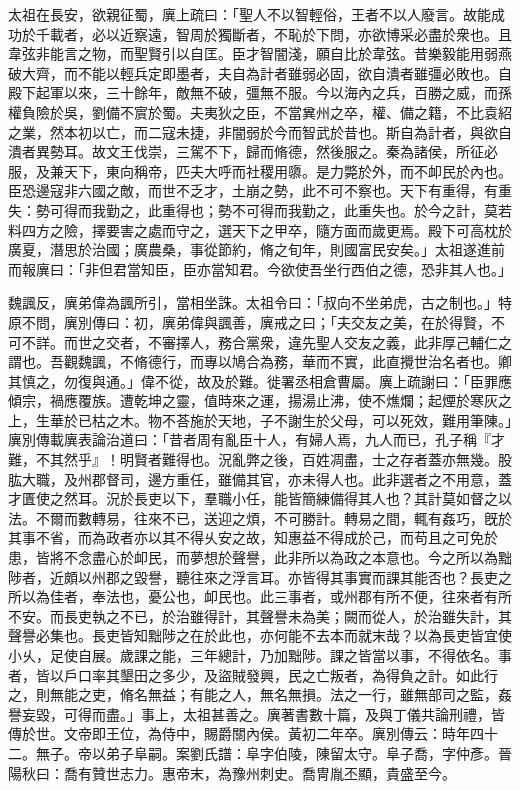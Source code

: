 \begin{pinyinscope}
太祖在長安，欲親征蜀，廙上疏曰：「聖人不以智輕俗，王者不以人廢言。故能成功於千載者，必以近察遠，智周於獨斷者，不恥於下問，亦欲博采必盡於衆也。且韋弦非能言之物，而聖賢引以自匡。臣才智闇淺，願自比於韋弦。昔樂毅能用弱燕破大齊，而不能以輕兵定即墨者，夫自為計者雖弱必固，欲自潰者雖彊必敗也。自殿下起軍以來，三十餘年，敵無不破，彊無不服。今以海內之兵，百勝之威，而孫權負險於吳，劉備不賔於蜀。夫夷狄之臣，不當兾州之卒，權、備之籍，不比袁紹之業，然本初以亡，而二寇未捷，非闇弱於今而智武於昔也。斯自為計者，與欲自潰者異勢耳。故文王伐崇，三駕不下，歸而脩德，然後服之。秦為諸侯，所征必服，及兼天下，東向稱帝，匹夫大呼而社稷用隳。是力斃於外，而不卹民於內也。臣恐邊寇非六國之敵，而世不乏才，土崩之勢，此不可不察也。天下有重得，有重失：勢可得而我勤之，此重得也；勢不可得而我勤之，此重失也。於今之計，莫若料四方之險，擇要害之處而守之，選天下之甲卒，隨方面而歲更焉。殿下可高枕於廣夏，潛思於治國；廣農桑，事從節約，脩之旬年，則國富民安矣。」太祖遂進前而報廙曰：「非但君當知臣，臣亦當知君。今欲使吾坐行西伯之德，恐非其人也。」

魏諷反，廙弟偉為諷所引，當相坐誅。太祖令曰：「叔向不坐弟虎，古之制也。」特原不問，廙別傳曰：初，廙弟偉與諷善，廙戒之曰；「夫交友之美，在於得賢，不可不詳。而世之交者，不審擇人，務合黨衆，違先聖人交友之義，此非厚己輔仁之謂也。吾觀魏諷，不脩德行，而專以鳩合為務，華而不實，此直攪世治名者也。卿其慎之，勿復與通。」偉不從，故及於難。徙署丞相倉曹屬。廙上疏謝曰：「臣罪應傾宗，禍應覆族。遭乾坤之靈，值時來之運，揚湯止沸，使不燋爛；起煙於寒灰之上，生華於已枯之木。物不荅施於天地，子不謝生於父母，可以死效，難用筆陳。」廙別傳載廙表論治道曰：「昔者周有亂臣十人，有婦人焉，九人而已，孔子稱『才難，不其然乎』！明賢者難得也。況亂弊之後，百姓凋盡，士之存者蓋亦無幾。股肱大職，及州郡督司，邊方重任，雖備其官，亦未得人也。此非選者之不用意，蓋才匱使之然耳。況於長吏以下，羣職小任，能皆簡練備得其人也？其計莫如督之以法。不爾而數轉易，往來不已，送迎之煩，不可勝計。轉易之間，輒有姦巧，旣於其事不省，而為政者亦以其不得乆安之故，知惠益不得成於己，而苟且之可免於患，皆將不念盡心於卹民，而夢想於聲譽，此非所以為政之本意也。今之所以為黜陟者，近頗以州郡之毀譽，聽往來之浮言耳。亦皆得其事實而課其能否也？長吏之所以為佳者，奉法也，憂公也，卹民也。此三事者，或州郡有所不便，往來者有所不安。而長吏執之不已，於治雖得計，其聲譽未為美；闕而從人，於治雖失計，其聲譽必集也。長吏皆知黜陟之在於此也，亦何能不去本而就末哉？以為長吏皆宜使小乆，足使自展。歲課之能，三年總計，乃加黜陟。課之皆當以事，不得依名。事者，皆以戶口率其墾田之多少，及盜賊發興，民之亡叛者，為得負之計。如此行之，則無能之吏，脩名無益；有能之人，無名無損。法之一行，雖無部司之監，姦譽妄毀，可得而盡。」事上，太祖甚善之。廙著書數十篇，及與丁儀共論刑禮，皆傳於世。文帝即王位，為侍中，賜爵關內侯。黃初二年卒。廙別傳云：時年四十二。無子。帝以弟子阜嗣。案劉氏譜：阜字伯陵，陳留太守。阜子喬，字仲彥。晉陽秋曰：喬有贊世志力。惠帝末，為豫州刺史。喬冑胤丕顯，貴盛至今。


\end{pinyinscope}